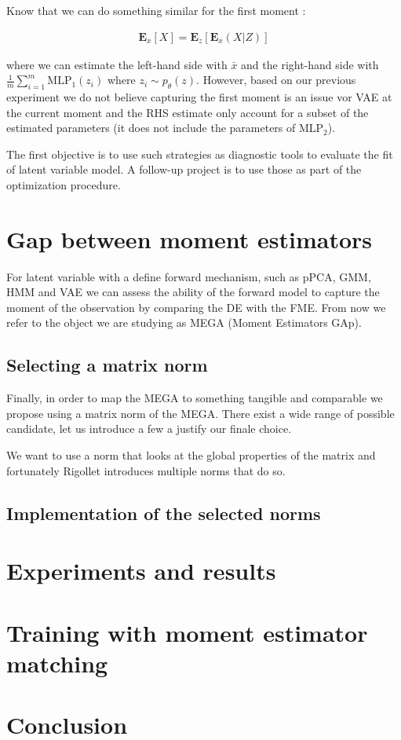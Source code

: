 \documentclass{article}
\newcommand{\Ex}{\textbf{E}_x}
\newcommand{\Ez}{\textbf{E}_z}
\begin{document}
Know that we can do something similar for the first moment :

\begin{align}
\Ex[X] = \Ez[\Ex(X|Z)] 
\label{rhs}
\end{align}

where we can estimate the left-hand side with $\bar{x}$ and the right-hand side with $\frac{1}{m} \sum_{i=1}^m \text{MLP}_1(z_i)$ where $z_i \sim p_\theta(z)$. However, based on our previous experiment we do not believe capturing the first moment is an issue vor VAE at the current moment and the RHS estimate only account for a subset of the estimated parameters (it does not include the parameters of MLP$_2$). 

\bigskip

The first objective is to use such strategies as diagnostic tools to evaluate the fit of latent variable model. A follow-up project is to use those as part of the optimization procedure. 

\section{Gap between moment estimators}

For latent variable with a define forward mechanism, such as pPCA, GMM, HMM and VAE we can assess the ability of the forward model to capture the moment of the observation by comparing the DE with the FME. From now we refer to the object we are studying as MEGA (Moment Estimators GAp). 

\subsection{Selecting a matrix norm}

Finally, in order to map the MEGA to something tangible and comparable we propose using a matrix norm of the MEGA. There exist a wide range of possible candidate, let us introduce a few a justify our finale choice. 

\bigskip

We want to use a norm that looks at the global properties of the matrix and fortunately Rigollet \cite{rigollet15} introduces multiple norms that do so.  

\subsection{Implementation of the selected norms}

\section{Experiments and results}

\section{Training with moment estimator matching}

\section{Conclusion}

\pagebreak


\bigskip
\end{document}
